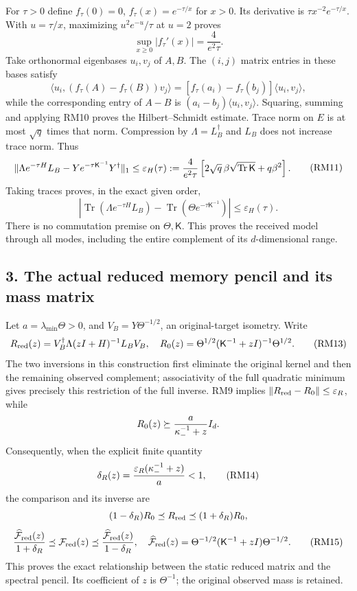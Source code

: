 \documentclass[11pt]{article}
\begin{document}
For \(\tau>0\) define \(f_\tau(0)=0\), \(f_\tau(x)=e^{-\tau/x}\) for \(x>0\). Its derivative is \(\tau x^{-2}e^{-\tau/x}\). With \(u=\tau/x\), maximizing \(u^2e^{-u}/\tau\) at \(u=2\) proves \[
\sup_{x\ge0}|f_\tau'(x)|=\frac4{e^2\tau}.
\tag{RM10}
\] Take orthonormal eigenbases \(u_i,v_j\) of \(A,B\). The \((i,j)\) matrix entries in these bases satisfy \[
\langle u_i,(f_\tau(A)-f_\tau(B))v_j\rangle
=[f_\tau(a_i)-f_\tau(b_j)]\langle u_i,v_j\rangle,
\] while the corresponding entry of \(A-B\) is \((a_i-b_j)\langle u_i,v_j\rangle\). Squaring, summing and applying RM10 proves the Hilbert--Schmidt estimate. Trace norm on \(E\) is at most \(\sqrt q\) times that norm. Compression by \(\Lambda=L_B^\dagger\) and \(L_B\) does not increase trace norm. Thus \[
\begin{split}
\|\Lambda e^{-\tau H}L_B-Ye^{-\tau\mathsf K^{-1}}Y^\dagger\|_1
\le \varepsilon_H(\tau)
:={4\over e^2\tau}
\left[2\sqrt q\,\beta\sqrt{\operatorname{Tr}\mathsf K}+q\beta^2\right].
\end{split}\tag{RM11}
\] Taking traces proves, in the exact given order, \[
\left|\operatorname{Tr}(\Lambda e^{-\tau H}L_B)
-\operatorname{Tr}(\Theta e^{-\tau\mathsf K^{-1}})\right|
\le\varepsilon_H(\tau).
\tag{RM12}
\] There is no commutation premise on \(\Theta,\mathsf K\). This proves the received model through all modes, including the entire complement of its \(d\)-dimensional range.

\subsection{3. The actual reduced memory pencil and its mass matrix}\label{the-actual-reduced-memory-pencil-and-its-mass-matrix}

Let \(a=\lambda_{\min}\Theta>0\), and \(V_B=Y\Theta^{-1/2}\), an original-target isometry. Write \[
R_{\rm red}(z)=V_B^\dagger\Lambda(zI+H)^{-1}L_BV_B,
\quad
R_0(z)=\Theta^{1/2}(\mathsf K^{-1}+zI)^{-1}\Theta^{1/2}.
\tag{RM13}
\] The two inversions in this construction first eliminate the original kernel and then the remaining observed complement; associativity of the full quadratic minimum gives precisely this restriction of the full inverse. RM9 implies \(\|R_{\rm red}-R_0\|\le\varepsilon_R\), while \[
R_0(z)\succeq {a\over\kappa_-^{-1}+z}I_d.
\] Consequently, when the explicit finite quantity \[
\delta_R(z)={\varepsilon_R(\kappa_-^{-1}+z)\over a}<1,
\tag{RM14}
\] the comparison and its inverse are \[
(1-\delta_R)R_0\preceq R_{\rm red}\preceq(1+\delta_R)R_0,
\] \[
{\widehat{\mathcal F}_{\rm red}(z)\over1+\delta_R}
\preceq\mathcal F_{\rm red}(z)
\preceq{\widehat{\mathcal F}_{\rm red}(z)\over1-\delta_R},
\quad
\widehat{\mathcal F}_{\rm red}(z)
=\Theta^{-1/2}(\mathsf K^{-1}+zI)\Theta^{-1/2}.
\tag{RM15}
\] This proves the exact relationship between the static reduced matrix and the spectral pencil. Its coefficient of \(z\) is \(\Theta^{-1}\); the original observed mass is retained.
\end{document}
